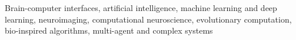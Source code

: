 
\begin{cvparagraph}






Brain-computer interfaces, artificial intelligence, machine learning and deep learning, neuroimaging, computational neuroscience, evolutionary computation, bio-inspired algorithms, multi-agent and complex systems

\end{cvparagraph}
